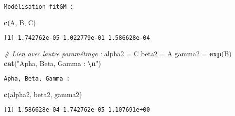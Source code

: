 \documentclass[
]{article}
\newenvironment{Shaded}{\begin{snugshade}}{\end{snugshade}}
\newcommand{\CommentTok}[1]{\textcolor[rgb]{0.56,0.35,0.01}{\textit{#1}}}
\newcommand{\FunctionTok}[1]{\textcolor[rgb]{0.13,0.29,0.53}{\textbf{#1}}}
\newcommand{\NormalTok}[1]{#1}
\newcommand{\OtherTok}[1]{\textcolor[rgb]{0.56,0.35,0.01}{#1}}
\newcommand{\SpecialCharTok}[1]{\textcolor[rgb]{0.81,0.36,0.00}{\textbf{#1}}}
\newcommand{\StringTok}[1]{\textcolor[rgb]{0.31,0.60,0.02}{#1}}
\begin{document}
\begin{verbatim}
Modélisation fitGM :  
\end{verbatim}

\begin{Shaded}
\begin{Highlighting}[]
\FunctionTok{c}\NormalTok{(A, B, C)}
\end{Highlighting}
\end{Shaded}

\begin{verbatim}
[1] 1.742762e-05 1.022779e-01 1.586628e-04
\end{verbatim}

\begin{Shaded}
\begin{Highlighting}[]
\CommentTok{\# Lien avec l\textquotesingle{}autre paramétrage :}
\NormalTok{alpha2 }\OtherTok{=}\NormalTok{ C}
\NormalTok{beta2 }\OtherTok{=}\NormalTok{ A}
\NormalTok{gamma2 }\OtherTok{=} \FunctionTok{exp}\NormalTok{(B)}
\FunctionTok{cat}\NormalTok{(}\StringTok{"Apha, Beta, Gamma : }\SpecialCharTok{\textbackslash{}n}\StringTok{"}\NormalTok{)}
\end{Highlighting}
\end{Shaded}

\begin{verbatim}
Apha, Beta, Gamma : 
\end{verbatim}

\begin{Shaded}
\begin{Highlighting}[]
\FunctionTok{c}\NormalTok{(alpha2, beta2, gamma2)  }
\end{Highlighting}
\end{Shaded}

\begin{verbatim}
[1] 1.586628e-04 1.742762e-05 1.107691e+00
\end{verbatim}
\end{document}
